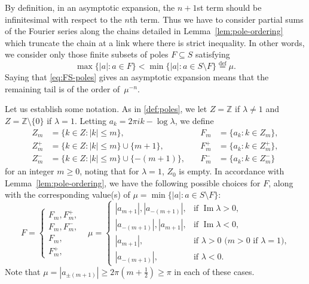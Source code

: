 \documentclass[11pt,a4paper]{amsart}
\newcommand{\Z}{\mathbb{Z}}
\renewcommand{\Im}{\operatorname{Im}}
\newcommand{\eqdef}{\overset{\mathrm{def}}{=}}
\theoremstyle{plain}
\theoremstyle{remark}
\begin{document}
By definition, in an asymptotic expansion, the $n+1$st term should be infinitesimal with respect to the $n$th term. 
Thus we have to consider partial sums of the Fourier series along the chains detailed in Lemma~\ref{lem:pole-ordering} which truncate the chain at a link where there is strict inequality. In other words, we consider only those finite subsets of poles $F \subseteq S$ satisfying 
$$
	\max\{ |a| : a \in F \} < \min\{ |a| : a \in S \setminus F \} \eqdef \mu.
$$
Saying that \eqref{eq:FS-poles} gives an asymptotic expansion means that the
remaining tail is of the order of~$\mu^{-n}$. 

Let us establish some notation. As in \eqref{def:poles}, we let $Z = \Z$ if $\lambda \neq 1$
and $Z = \Z \setminus \{0\}$ if $\lambda = 1$. Letting $a_{k} = 2\pi i k - \log\lambda$, we define
%
\begin{equation}
\label{def:heads}
	\begin{alignedat}{2}
		    Z_{m} &= \{ k \in Z : |k| \leq m \},
		    	      &\quad
			F_{m} &= \{ a_{k} : k \in Z_{m} \},
		          \\
		Z_{m}^{+} &= \{ k \in Z : |k| \leq m \} \cup \{m+1\},
		    	      &\quad
		F_{m}^{+} &= \{ a_{k} : k \in Z_{m}^{+} \},
		          \\
		Z_{m}^{-} &= \{ k \in Z : |k| \leq m \} \cup \{-(m+1)\},
		    	      &\quad
		F_{m}^{-} &= \{ a_{k} : k \in Z_{m}^{-} \}
	\end{alignedat}
\end{equation}
%
for an integer $m \geq 0$, noting that for $\lambda = 1$, $Z_{0}$ is empty.
In accordance with Lemma~\ref{lem:pole-ordering}, we have the following possible choices for
$F$, along with the corresponding value(s) of $\mu = \min\{ |a| : a \in S \setminus F \}$:
%
\begin{equation}
\label{eq:heads-cases}
F = \begin{cases}
	F_{m}, F_{m}^{+},	&%
	\\
	F_{m}, F_{m}^{-},	&%
	\\
	F_{m},				&%
	\\
	F_{m}^{+},			&%
	\end{cases}
	\mu = \begin{cases}
		|a_{m+1}|, |a_{-(m+1)}|,	& \text{if $\Im\lambda > 0$,}
		\\
		|a_{-(m+1)}|, |a_{m+1}|,	& \text{if $\Im\lambda < 0$,}
		\\
		|a_{m+1}|,				& \text{if $\lambda > 0$ ($m > 0$ if $\lambda = 1$),}
		\\
		|a_{-(m+1)}|,			& \text{if $\lambda < 0$.}
	\end{cases}
\end{equation}
%
Note that $\mu = |a_{\pm(m+1)}| \geq 2\pi( m + \frac{1}{2}) \geq \pi$ in each of these cases.
\end{document}
